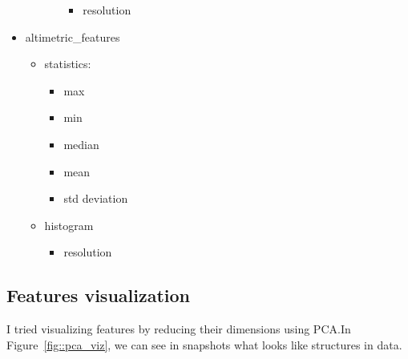 \documentclass[../main.tex]{subfile}
\begin{document}
\begin{itemize}
\begin{itemize}
\begin{itemize}
                \begin{itemize}
                    \item resolution
                \end{itemize}
            \end{itemize}
        \end{itemize}
        \item altimetric_features
        \begin{itemize}
            \item statistics:
            \begin{itemize}
                \item max
                \item min
                \item median
                \item mean
                \item std deviation
            \end{itemize}
            \item histogram
            \begin{itemize}
                \item resolution
            \end{itemize}
        \end{itemize}
    \end{itemize}

    \subsection{Features visualization}

    I tried visualizing features by reducing their dimensions using PCA.\@ In Figure~\ref{fig::pca_viz}, we can see in snapshots what looks like structures in data.
\end{document}
